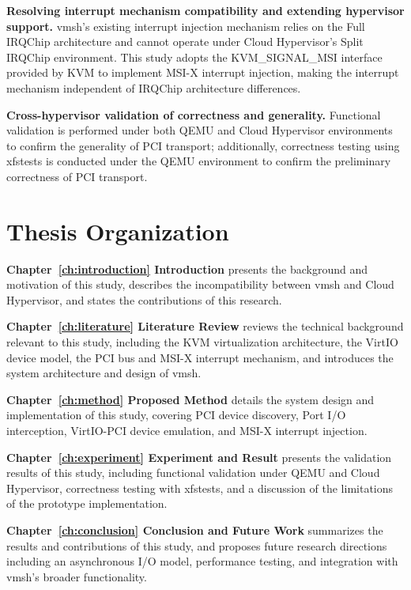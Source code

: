 \begin{ZhChapter}
\begin{sloppypar}
\textbf{Resolving interrupt mechanism compatibility and extending hypervisor support.} vmsh's existing interrupt injection mechanism relies on the Full IRQChip architecture and cannot operate under Cloud Hypervisor's Split IRQChip environment. This study adopts the KVM\_SIGNAL\_MSI interface provided by KVM to implement MSI-X interrupt injection, making the interrupt mechanism independent of IRQChip architecture differences.
\end{sloppypar}

\begin{sloppypar}
\textbf{Cross-hypervisor validation of correctness and generality.} Functional validation is performed under both QEMU and Cloud Hypervisor environments to confirm the generality of PCI transport; additionally, correctness testing using xfstests is conducted under the QEMU environment to confirm the preliminary correctness of PCI transport.
\end{sloppypar}

\section{Thesis Organization}
\label{sec:organization}

\textbf{Chapter~\ref{ch:introduction} Introduction} presents the background and motivation of this study, describes the incompatibility between vmsh and Cloud Hypervisor, and states the contributions of this research.

\textbf{Chapter~\ref{ch:literature} Literature Review} reviews the technical background relevant to this study, including the KVM virtualization architecture, the VirtIO device model, the PCI bus and MSI-X interrupt mechanism, and introduces the system architecture and design of vmsh.

\textbf{Chapter~\ref{ch:method} Proposed Method} details the system design and implementation of this study, covering PCI device discovery, Port I/O interception, VirtIO-PCI device emulation, and MSI-X interrupt injection.

\textbf{Chapter~\ref{ch:experiment} Experiment and Result} presents the validation results of this study, including functional validation under QEMU and Cloud Hypervisor, correctness testing with xfstests, and a discussion of the limitations of the prototype implementation.

\textbf{Chapter~\ref{ch:conclusion} Conclusion and Future Work} summarizes the results and contributions of this study, and proposes future research directions including an asynchronous I/O model, performance testing, and integration with vmsh's broader functionality.

\end{ZhChapter}
